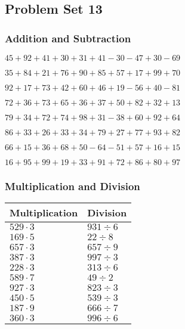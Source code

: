 \hypertarget{problem-set-13}{%
\subsection{Problem Set 13}\label{problem-set-13}}

\hypertarget{addition-and-subtraction}{%
\subsubsection{Addition and
Subtraction}\label{addition-and-subtraction}}

\(45+92+41+30+31+41-30-47+30-69\)

\(35+84+21+76+90+85+57+17+99+70\)

\(92+17+73+42+60+46+19-56+40-81\)

\(72+36+73+65+36+37+50+82+32+13\)

\(79+34+72+74+98+31-38+60+92+64\)

\(86+33+26+33+34+79+27+77+93+82\)

\(66+15+36+68+50-64-51+57+16+15\)

\(16+95+99+19+33+91+72+86+80+97\)

\hypertarget{multiplication-and-division}{%
\subsubsection{Multiplication and
Division}\label{multiplication-and-division}}

\begin{longtable}[]{@{}ll@{}}
\toprule
Multiplication & Division\tabularnewline
\midrule
\endhead
\(529\cdot3\) & \(931÷6\)\tabularnewline
\(169\cdot5\) & \(22÷8\)\tabularnewline
\(657\cdot3\) & \(657÷9\)\tabularnewline
\(387\cdot3\) & \(997÷3\)\tabularnewline
\(228\cdot3\) & \(313÷6\)\tabularnewline
\(589\cdot7\) & \(49÷2\)\tabularnewline
\(927\cdot3\) & \(823÷3\)\tabularnewline
\(450\cdot5\) & \(539÷3\)\tabularnewline
\(187\cdot9\) & \(666÷7\)\tabularnewline
\(360\cdot3\) & \(996÷6\)\tabularnewline
\bottomrule
\end{longtable}
